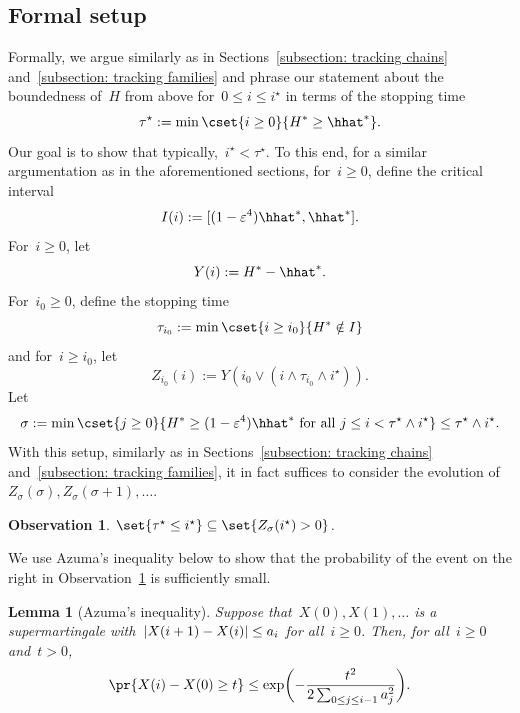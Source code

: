 \documentclass[11pt]{amsart}
\newcommand{\eps}{\varepsilon}
\DeclarePairedDelimiter{\paren}{\lparen}{\rparen}
\DeclarePairedDelimiter{\abs}{\lvert}{\rvert}
\newcommand{\stforall}{\text{ for all }}
\newtheorem{lemma}[algocf]{Lemma}
\newtheorem{observation}[algocf]{Observation}
\theoremstyle{definition}
\numberwithin{equation}{section}
\begin{document}
	\subsection{Formal setup}
	Formally, we argue similarly as in Sections~\ref{subsection: tracking chains} and~\ref{subsection: tracking families} and phrase our statement about the boundedness of~$H$ from above for~$0\leq i\leq i^\star$ in terms of the stopping time
	\begin{equation*}
		\tau^\star:=\min\cset{i\geq 0}{ H^*\geq \hhat^* }.
	\end{equation*}
	Our goal is to show that typically,~$i^\star <\tau^\star$.
	To this end, for a similar argumentation as in the aforementioned sections, for~$i\geq 0$, define the critical interval
	\begin{equation*}
		I(i):=[(1-\eps^4)\hhat^*,\hhat^*].
	\end{equation*}
	For~$i\geq 0$, let
	\begin{equation*}
		Y(i):=H^*-\hhat^*.
	\end{equation*}
	For~$i_0\geq 0$, define the stopping time
	\begin{equation*}
		\tau_{i_0}:=\min\cset{i\geq i_0}{H^*\notin I}
	\end{equation*}
	and for~$i\geq i_0$, let
	\begin{equation*}
		Z_{i_0}(i):=Y(i_0\vee (i\wedge \tau_{i_0}\wedge i^\star)).
	\end{equation*}
	Let
	\begin{equation*}
		\sigma:=\min\cset{j\geq 0}{ H^*\geq (1-\eps^4)\hhat^*\stforall j\leq i<\tau^\star\wedge i^\star }\leq \tau^\star\wedge i^\star.
	\end{equation*}
	With this setup, similarly as in Sections~\ref{subsection: tracking chains} and~\ref{subsection: tracking families}, it in fact suffices to consider the evolution of~$Z_\sigma(\sigma),Z_\sigma(\sigma+1),\ldots$.
	
	\begin{observation}\label{observation: critical times}
		$\set{\tau^\star\leq i^\star}\subseteq \set{Z_\sigma(i^\star)>0}$.
	\end{observation}
	
	We use Azuma's inequality below to show that the probability of the event on the right in Observation~\ref{observation: critical times} is sufficiently small.
	
	\begin{lemma}[Azuma's inequality]\label{lemma: azuma}
		Suppose that~$X(0),X(1),\ldots$ is a supermartingale with~$\abs{X(i+1)-X(i)}\leq a_i$ for all~$i\geq 0$.
		Then, for all~$i\geq 0$ and~$t>0$,
		\begin{equation*}
			\pr{X(i)- X(0)\geq t}\leq\exp\paren[\bigg]{-\frac{t^2}{2\sum_{0\leq j\leq i-1} a_j^2}}.
		\end{equation*}
	\end{lemma}
	
\end{document}
